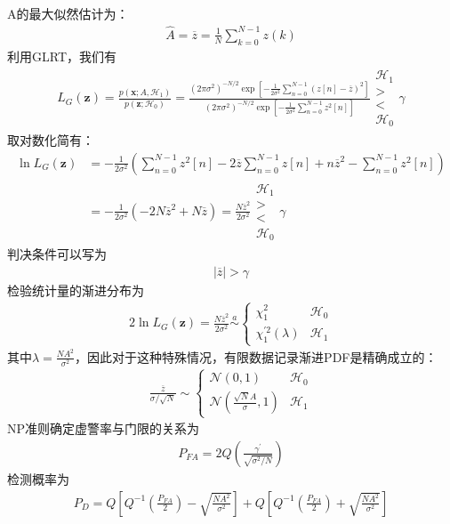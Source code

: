 \documentclass[fontset=windows]{article}
\numberwithin{figure}{section}
\begin{document}
A的最大似然估计为：
\begin{align*}
    \hat{A}=\overline{z}=\frac{1}{N}\sum_{k=0}^{N-1}z(k)
\end{align*}
利用GLRT，我们有
\begin{align*}
    L_G(\mathbf{z})
    =\frac{p(\mathbf{x};A,\mathcal{H}_1)}{p(\mathbf{z};\mathcal{H}_0)}
    =\frac{(2\pi \sigma^2)^{-N/2}\exp\left[-\frac{1}{2\sigma^2}\sum_{n=0}^{N-1}(z[n]-\overline{z})^2\right]}
    {(2\pi \sigma^2)^{-N/2}\exp\left[-\frac{1}{2\sigma^2}\sum_{n=0}^{N-1}z^2[n]\right]}
    \begin{matrix}
        \mathcal{H}_1 \\>\\<\\\mathcal{H_0}
    \end{matrix}\gamma
\end{align*}
取对数化简有：
\begin{align*}
    \ln L_G(\mathbf{z})
     & =-\frac{1}{2\sigma^2}\left(\sum_{n=0}^{N-1}z^2[n]-
    2\overline{z}\sum_{n=0}^{N-1}z[n]+n\overline{z}^2-\sum_{n=0}^{N-1}z^2[n]\right)             \\
     & =-\frac{1}{2\sigma^2}(-2N\overline{z}^2+N\overline{z})=\frac{N\overline{z}^2}{2\sigma^2}
    \begin{matrix}
        \mathcal{H}_1 \\>\\<\\\mathcal{H_0}
    \end{matrix}\gamma
\end{align*}
判决条件可以写为
\begin{align*}
    \vert \overline{z}\vert >\gamma
\end{align*}
检验统计量的渐进分布为
\begin{align*}
    2\ln L_G(\mathbf{z})=\frac{N\overline{z}^2}{2\sigma^2}\overset{a}{\sim}
    \left\{\begin{matrix}
               \chi^2_1                   & \mathcal{H}_0 \\
               \chi_1^{\prime 2}(\lambda) & \mathcal{H}_1
           \end{matrix}
    \right.
\end{align*}
其中\(\lambda=\frac{NA^2}{\sigma^2}\)，因此对于这种特殊情况，有限数据记录渐进PDF是精确成立的：
\begin{align*}
    \frac{\overline{z}}{\sigma/\sqrt{N}}\sim
    \left\{\begin{matrix}
               \mathcal{N}(0,1)                        & \mathcal{H}_0 \\
               \mathcal{N}(\frac{\sqrt{N}A}{\sigma},1) & \mathcal{H}_1
           \end{matrix}
    \right.
\end{align*}
NP准则确定虚警率与门限的关系为
\begin{align*}
    P_{FA}=2Q\left(\frac{\gamma^{\prime}}{\sqrt{\sigma^2/N}}\right)
\end{align*}
检测概率为
\begin{align*}
    P_D=Q\left[Q^{-1}\left(\frac{P_{FA}}{2}\right)-\sqrt{\frac{NA^2}{\sigma^2}}\right]+
    Q\left[Q^{-1}\left(\frac{P_{FA}}{2}\right)+\sqrt{\frac{NA^2}{\sigma^2}}\right]
\end{align*}
\end{document}
